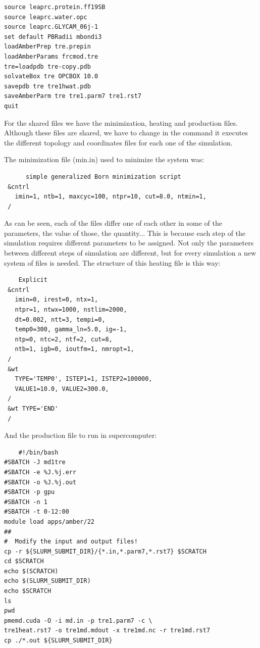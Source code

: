 \documentclass[a4paper]{article}
\begin{document}
\begin{verbatim}
source leaprc.protein.ff19SB
source leaprc.water.opc
source leaprc.GLYCAM_06j-1
set default PBRadii mbondi3
loadAmberPrep tre.prepin
loadAmberParams frcmod.tre
tre=loadpdb tre-copy.pdb
solvateBox tre OPCBOX 10.0
savepdb tre tre1hwat.pdb
saveAmberParm tre tre1.parm7 tre1.rst7
quit
\end{verbatim}


For the shared files we have the minimization, heating and production files. Although these files are shared, we have to change in the command it executes the different topology and coordinates files for each one of the simulation.

The minimization file (min.in) used to minimize the system was:

\begin{verbatim}
      simple generalized Born minimization script
 &cntrl
   imin=1, ntb=1, maxcyc=100, ntpr=10, cut=8.0, ntmin=1,
 /

\end{verbatim}

As can be seen, each of the files differ one of each other in some of the parameters, the value of those, the quantity... This is because each step of the simulation requires different parameters to be assigned. Not only the parameters between different steps of simulation are different, but for every simulation a new system of files is needed. The structure of this heating file is this way:

\begin{verbatim}
    Explicit
 &cntrl
   imin=0, irest=0, ntx=1,
   ntpr=1, ntwx=1000, nstlim=2000,
   dt=0.002, ntt=3, tempi=0,
   temp0=300, gamma_ln=5.0, ig=-1,
   ntp=0, ntc=2, ntf=2, cut=8,
   ntb=1, igb=0, ioutfm=1, nmropt=1,
 /
 &wt
   TYPE='TEMP0', ISTEP1=1, ISTEP2=100000,
   VALUE1=10.0, VALUE2=300.0,
 /
 &wt TYPE='END' 
 /

\end{verbatim}

And the production file to run in supercomputer:

\begin{verbatim}
    #!/bin/bash
#SBATCH -J md1tre
#SBATCH -e %J.%j.err
#SBATCH -o %J.%j.out
#SBATCH -p gpu
#SBATCH -n 1
#SBATCH -t 0-12:00
module load apps/amber/22
##
#  Modify the input and output files!
cp -r ${SLURM_SUBMIT_DIR}/{*.in,*.parm7,*.rst7} $SCRATCH
cd $SCRATCH
echo $(SCRATCH)
echo $(SLURM_SUBMIT_DIR)
echo $SCRATCH
ls
pwd
pmemd.cuda -O -i md.in -p tre1.parm7 -c \
tre1heat.rst7 -o tre1md.mdout -x tre1md.nc -r tre1md.rst7
cp ./*.out ${SLURM_SUBMIT_DIR}

\end{verbatim}
\end{document}
